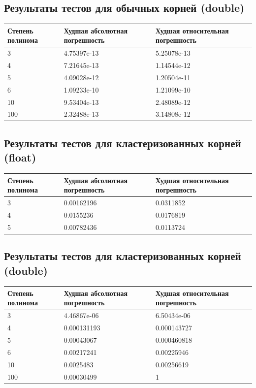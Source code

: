 \documentclass[a4paper,12pt]{article}
\begin{document}
\subsection{Результаты тестов для обычных корней (double)}
\begin{center}
  \begin{tabular}{|p{4.5cm}|p{5.5cm}|p{5.5cm}|}
  \hline
  \textbf{Степень полинома}  &  \textbf{Худшая абсолютная погрешность} & \textbf{Худшая относительная погрешность} \\
  \hline
  3 & 4.75397e-13 & 5.25078e-13 \\
  \hline
  4 & 7.21645e-13 & 1.14544e-12 \\
  \hline
  5 & 4.09028e-12 & 1.20504e-11 \\
  \hline
  6 & 1.09233e-10 & 1.21099e-10 \\
  \hline
  10 & 9.53404e-13 & 2.48089e-12 \\
  \hline
  100 & 2.32488e-13 & 3.14808e-12 \\
  \hline
\end{tabular}
\label{tab:my_label_2}
\end{center}

\subsection{Результаты тестов для кластеризованных корней (float)}
\begin{center}
  \begin{tabular}{|p{4.5cm}|p{5.5cm}|p{5.5cm}|}
  \hline
  \textbf{Степень полинома}  &  \textbf{Худшая абсолютная погрешность} & \textbf{Худшая относительная погрешность} \\
  \hline
  3 & 0.00162196 & 0.0311852 \\
  \hline
  4 & 0.0155236 & 0.0176819 \\
  \hline
  5 & 0.00782436 & 0.0113724 \\
  \hline
\end{tabular}
\label{tab:my_label_2}
\end{center}

\subsection{Результаты тестов для кластеризованных корней (double)}
\begin{center}
  \begin{tabular}{|p{4.5cm}|p{5.5cm}|p{5.5cm}|}
  \hline
  \textbf{Степень полинома}  &  \textbf{Худшая абсолютная погрешность} & \textbf{Худшая относительная погрешность} \\
  \hline
  3 & 4.46867e-06 & 6.50434e-06 \\
  \hline
  4 & 0.000131193 & 0.000143727 \\
  \hline
  5 & 0.00043067 & 0.000460818 \\
  \hline
  6 & 0.00217241 & 0.00225946 \\
  \hline
  10 & 0.0025483 & 0.00256619 \\
  \hline
  100 & 0.00030499 & 1 \\
  \hline
\end{tabular}
\label{tab:my_label_2}
\end{center}
\end{document}
